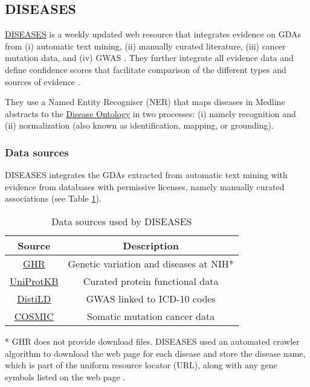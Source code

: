 \subsection{DISEASES}
\label{subsec:DISEASES}
\href{https://goo.gl/KGQsd9}{DISEASES} is a weekly updated web resource that integrates evidence on GDAs from (i) automatic text mining, (ii) manually curated literature, (iii) cancer mutation data, and (iv) GWAS \cite{DISEASES2015}. They further integrate all evidence data and define confidence scores that facilitate comparison of the different types and sources of evidence \cite{DISEASES2015}.

They use a Named Entity Recogniser (NER) that maps diseases in Medline abstracts to the \href{http://disease-ontology.org/}{Disease Ontology} \cite{schriml2012} in two processes: (i) namely recognition and (ii) normalization (also known as identification, mapping, or grounding).

\subsubsection{Data sources}
DISEASES integrates the GDAs extracted from automatic text mining with evidence from databases with permissive licenses, namely manually curated associations (see Table \ref{tab:diseases_data}).
\begin{table}[H]
\centering
    \begin{tabular}{c|c}
         Source & Description  \\
         \hline
         \href{https://goo.gl/gnQSYt}{GHR} & Genetic variation and diseases at NIH*\\
         \href{https://goo.gl/d2PhpC}{UniProtKB} & Curated protein functional data \cite{uniprot2017} \\
         \href{https://goo.gl/hYjVeR}{DistiLD} & GWAS linked to ICD-10 codes \cite{palleja2011} \\
         \href{https://goo.gl/qcY8qo}{COSMIC} & Somatic mutation cancer data \cite{cosmic2017}
    \end{tabular}
    \caption{Data sources used by DISEASES \cite{DISEASES2015} \label{tab:diseases_data}}
\end{table}
* GHR does not provide download files. DISEASES used an automated crawler algorithm to download the web page for each disease and store the disease name, which is part of the uniform resource locator (URL), along with any gene symbols listed on the web page \cite{DISEASES2015}.